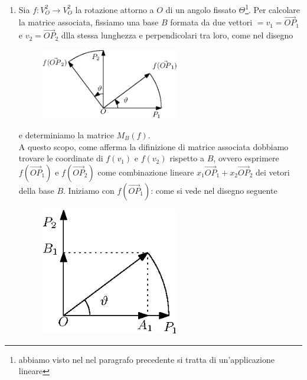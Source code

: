 \begin{esempio}
  \begin{enumerate}
  \item Sia $f:V_O^2\to V_O^2$ la rotazione attorno a $O$ di un angolo fissato $\Theta$\footnote{abbiamo visto nel
      nel paragrafo precedente si tratta di un'applicazione lineare}. Per calcolare la matrice associata, fissiamo
    una base $B$ formata da due vettori $=v_1=\vec{OP}_1$ e $v_2=\vec{OP}_2$ dlla stessa lunghezza e
    perpendicolari tra loro, come nel disegno
    \begin{figure}[th]
      \centering
        \includegraphics[width=6cm]{img/finiti/imgex4-3-1.eps}
    \end{figure}

    e determiniamo la matrice $M_B(f)$.\\
    A questo scopo, come afferma la difinizione di matrice associata dobbiamo trovare le coordinate di $f(v_1)$ e
    $f(v_2)$ rispetto a $B$, ovvero esprimere $f(\vec{OP}_1)$ e $f(\vec{OP}_2)$ come combinazione lineare
    $x_1\vec{OP}_1+x_2\vec{OP}_2$ dei vetori della base $B$. Iniziamo con $f(\vec{OP}_1)$: come si vede nel
    disegno seguente
    \clearpage
    \begin{figure}[th]
      \centering
        \includegraphics[width=6cm]{img/finiti/imgex4-3-2.eps}
    \end{figure}


\end{enumerate}
\end{esempio}
